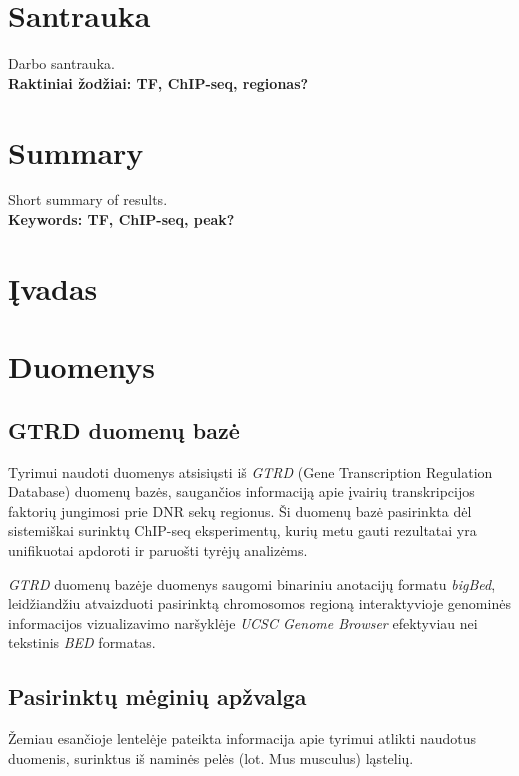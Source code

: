 \documentclass[12pt]{article}
\begin{document}
\section*{Santrauka}
Darbo santrauka.\\

\textbf{Raktiniai žodžiai: TF, ChIP-seq, regionas?}
\newpage

\section*{Summary}
Short summary of results.\\

\textbf{Keywords: TF, ChIP-seq, peak?}
\newpage

\section{Įvadas}
\newpage

\section{Duomenys}
\subsection{GTRD duomenų bazė}
Tyrimui naudoti duomenys atsisiųsti iš \emph{GTRD} (Gene Transcription
Regulation Database) duomenų bazės, saugančios informaciją apie įvairių
transkripcijos faktorių jungimosi prie DNR sekų regionus. Ši duomenų
bazė pasirinkta dėl sistemiškai surinktų ChIP-seq eksperimentų, kurių
metu gauti rezultatai yra unifikuotai apdoroti ir paruošti tyrėjų
analizėms.

\emph{GTRD} duomenų bazėje duomenys saugomi binariniu anotacijų
formatu \emph{bigBed}, leidžiandžiu atvaizduoti pasirinktą
chromosomos regioną interaktyvioje genominės informacijos
vizualizavimo naršyklėje \emph{UCSC Genome Browser} efektyviau
nei tekstinis \emph{BED} formatas.

\subsection{Pasirinktų mėginių apžvalga}
Žemiau esančioje lentelėje pateikta informacija apie tyrimui atlikti
naudotus duomenis, surinktus iš naminės pelės (lot. Mus musculus)
ląstelių.
\end{document}
